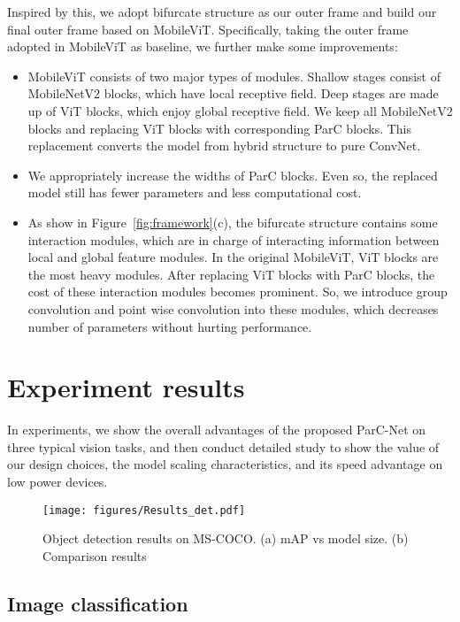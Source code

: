 \documentclass[10pt,twocolumn,letterpaper]{article}
\begin{document}
Inspired by this, we adopt bifurcate structure as our outer frame and build our final outer frame based on MobileViT. Specifically, taking the outer frame adopted in MobileViT as baseline, we further make some improvements: 

\begin{itemize}
\item MobileViT consists of two major types of modules. Shallow stages consist of MobileNetV2 blocks, which have local receptive field. Deep stages are made up of ViT blocks, which enjoy global receptive field. We keep all MobileNetV2 blocks and replacing ViT blocks with corresponding ParC blocks. This replacement converts the model from hybrid structure to pure ConvNet. 

\item We appropriately increase the widths of ParC blocks. Even so, the replaced model still has fewer parameters and less computational cost. 
\item As show in Figure~\ref{fig:framework}(c), the bifurcate structure contains some interaction modules, which are in charge of interacting information between local and global feature modules. In the original MobileViT, ViT blocks are the most heavy modules. After replacing ViT blocks with ParC blocks, the cost of these interaction modules becomes prominent. So, we introduce group convolution and point wise convolution into these modules, which decreases number of parameters without hurting performance.

\end{itemize} 


\section{Experiment results}
In experiments, we show the overall advantages of the proposed ParC-Net on three typical vision tasks, and then conduct detailed study to show the value of our design choices, the model scaling characteristics, and its speed advantage on low power devices.


\begin{figure*}[t]
\centering
\texttt{[image: figures/Results\_det.pdf]}
\caption{Object detection results on MS-COCO. (a) mAP vs model size. (b) Comparison results}
\label{fig:res_det}
\end{figure*}


\subsection{Image classification}
\label{sec: img_cls}
\end{document}

